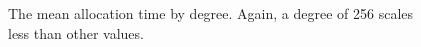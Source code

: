 \begin{figure}[h] 
  \centering
  \label{FIG:APX:ALLOCTIME}
  \caption{The mean allocation time by degree. Again, a degree of 256 scales
  less than other values.}
\end{figure}



